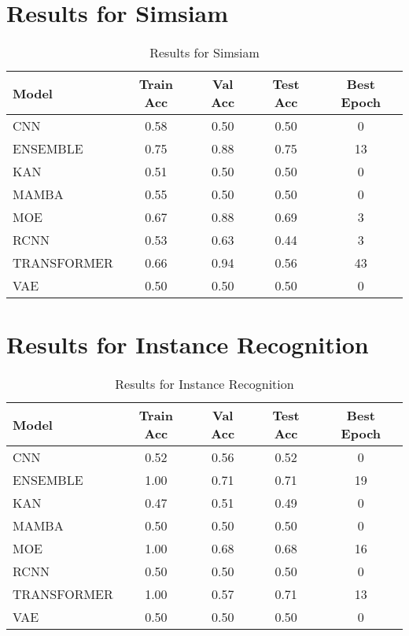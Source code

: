 \documentclass{article}
\begin{document}
\section*{Results for Simsiam}
\begin{table}[h!]
\centering
\begin{tabular}{lcccc}
\toprule
Model & Train Acc & Val Acc & Test Acc & Best Epoch \\
\midrule
CNN & 0.58 & 0.50 & 0.50 & 0 \\
ENSEMBLE & 0.75 & 0.88 & 0.75 & 13 \\
KAN & 0.51 & 0.50 & 0.50 & 0 \\
MAMBA & 0.55 & 0.50 & 0.50 & 0 \\
MOE & 0.67 & 0.88 & 0.69 & 3 \\
RCNN & 0.53 & 0.63 & 0.44 & 3 \\
TRANSFORMER & 0.66 & 0.94 & 0.56 & 43 \\
VAE & 0.50 & 0.50 & 0.50 & 0 \\
\bottomrule
\end{tabular}
\caption{Results for Simsiam}
\label{tab:simsiam}
\end{table}

\section*{Results for Instance Recognition}
\begin{table}[h!]
\centering
\begin{tabular}{lcccc}
\toprule
Model & Train Acc & Val Acc & Test Acc & Best Epoch \\
\midrule
CNN & 0.52 & 0.56 & 0.52 & 0 \\
ENSEMBLE & 1.00 & 0.71 & 0.71 & 19 \\
KAN & 0.47 & 0.51 & 0.49 & 0 \\
MAMBA & 0.50 & 0.50 & 0.50 & 0 \\
MOE & 1.00 & 0.68 & 0.68 & 16 \\
RCNN & 0.50 & 0.50 & 0.50 & 0 \\
TRANSFORMER & 1.00 & 0.57 & 0.71 & 13 \\
VAE & 0.50 & 0.50 & 0.50 & 0 \\
\bottomrule
\end{tabular}
\caption{Results for Instance Recognition}
\label{tab:instance_recognition}
\end{table}
\end{document}
